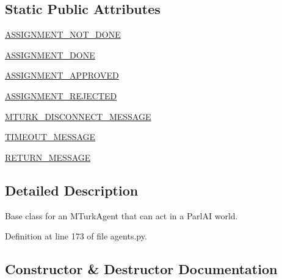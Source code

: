 \subsection*{Static Public Attributes}
\begin{DoxyCompactItemize}
\item 
\hyperlink{classparlai_1_1mturk_1_1core_1_1legacy__2018_1_1agents_1_1MTurkAgent_a1ef38f4dbd7d7666b54f78745ed03c0f}{A\+S\+S\+I\+G\+N\+M\+E\+N\+T\+\_\+\+N\+O\+T\+\_\+\+D\+O\+NE}
\item 
\hyperlink{classparlai_1_1mturk_1_1core_1_1legacy__2018_1_1agents_1_1MTurkAgent_ae4a70bd3098cbeb045666fd77ceb25cd}{A\+S\+S\+I\+G\+N\+M\+E\+N\+T\+\_\+\+D\+O\+NE}
\item 
\hyperlink{classparlai_1_1mturk_1_1core_1_1legacy__2018_1_1agents_1_1MTurkAgent_a2590f192e9c2e29f01fdbddca0618a1c}{A\+S\+S\+I\+G\+N\+M\+E\+N\+T\+\_\+\+A\+P\+P\+R\+O\+V\+ED}
\item 
\hyperlink{classparlai_1_1mturk_1_1core_1_1legacy__2018_1_1agents_1_1MTurkAgent_acd491e209dba5d0b7a06e0c58a38bb1a}{A\+S\+S\+I\+G\+N\+M\+E\+N\+T\+\_\+\+R\+E\+J\+E\+C\+T\+ED}
\item 
\hyperlink{classparlai_1_1mturk_1_1core_1_1legacy__2018_1_1agents_1_1MTurkAgent_a36476faaea21b47f065fba9a140dd5ee}{M\+T\+U\+R\+K\+\_\+\+D\+I\+S\+C\+O\+N\+N\+E\+C\+T\+\_\+\+M\+E\+S\+S\+A\+GE}
\item 
\hyperlink{classparlai_1_1mturk_1_1core_1_1legacy__2018_1_1agents_1_1MTurkAgent_a68c34b1ba222914c67440a1c1d26b09a}{T\+I\+M\+E\+O\+U\+T\+\_\+\+M\+E\+S\+S\+A\+GE}
\item 
\hyperlink{classparlai_1_1mturk_1_1core_1_1legacy__2018_1_1agents_1_1MTurkAgent_a29d3024b464db036df53d403e8b0abd9}{R\+E\+T\+U\+R\+N\+\_\+\+M\+E\+S\+S\+A\+GE}
\end{DoxyCompactItemize}


\subsection{Detailed Description}
\begin{DoxyVerb}Base class for an MTurkAgent that can act in a ParlAI world.
\end{DoxyVerb}
 

Definition at line 173 of file agents.\+py.



\subsection{Constructor \& Destructor Documentation}
\mbox{\label{classparlai_1_1mturk_1_1core_1_1legacy__2018_1_1agents_1_1MTurkAgent_a87dcf45fff05aac86acf6d3dfbef9557}} 
